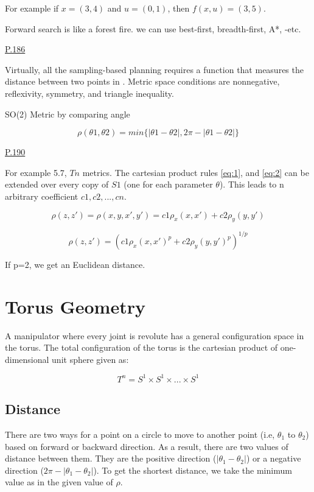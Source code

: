 For example if $x=(3,4)$ and $u=(0,1)$, then $f(x,u) = (3,5)$.

Forward search is like a forest fire. we can use best-first, breadth-first, A*, -etc.

\noindent \underline{P.186}

Virtually, all the sampling-based planning requires a function that measures the distance between two points in \cs. Metric space conditions are nonnegative, reflexivity, symmetry, and triangle inequality.

SO(2) Metric by comparing angle

\begin{equation}
    \rho(\theta1,\theta2) = min\{|\theta1-\theta2|, 2\pi-|\theta1 -\theta2|\}
\end{equation}

\noindent \underline{P.190}

For example 5.7, $Tn$ metrics. The cartesian product rules \ref{eq:1}, and \ref{eq:2} can be extended over every copy of $S1$ (one for each parameter $\theta$). This leads to n arbitrary coefficient $c1, c2, ..., cn$.

\begin{equation}\label{eq:1}
    \rho(z,z') = \rho(x,y,x',y') = c1\rho_x(x,x') + c2\rho_y(y,y')
\end{equation}

\begin{equation}\label{eq:2}
    \rho(z,z') = (c1\rho_x(x,x')^p + c2\rho_y(y,y')^p)^{1/p}
\end{equation}

If p=2, we get an Euclidean distance.



\section{Torus Geometry}
A manipulator where every joint is revolute has a general configuration space in the torus. The total configuration of the torus is the cartesian product of one-dimensional unit sphere given as:

\begin{equation}
    T^n = S^1 \times S^1 \times ... \times S^1
\end{equation}

\subsection{Distance}
There are two ways for a point on a circle to move to another point (i.e, $\theta_1$ to $\theta_2$) based on forward or backward direction. As a result, there are two values of distance between them. They are the positive direction ($|\theta_1 - \theta_2|$) or a negative direction ($2\pi - |\theta_1 - \theta_2|$). To get the shortest distance, we take the minimum value as in the given value of $\rho$.

